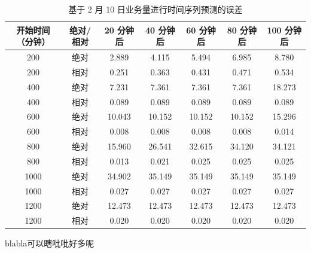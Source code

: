 \documentclass[a4paper]{article}
\begin{document}
\begin{table}[htbp]
	\centering
	\caption{基于 2 月 10 日业务量进行时间序列预测的误差}
	\label{tab:ssa_error}
	\begin{tabular}{cc|ccccc}
		\hline
		开始时间（分钟） & 绝对/相对 & 20 分钟后 & 40 分钟后 & 60 分钟后 & 80 分钟后  & 100 分钟后 \\
		\hline
		200 & 绝对 & 2.889 & 4.115 & 5.494 & 6.985 & 8.780 \\
		200 & 相对 & 0.251 & 0.363 & 0.431 & 0.471 & 0.534 \\
		\hline
		400 & 绝对 & 7.231 & 7.361 & 7.361 & 7.361 & 18.273 \\
		400 & 相对 & 0.089 & 0.089 & 0.089 & 0.089 & 0.089 \\
		\hline
		600 & 绝对 & 10.043 & 10.152 & 10.152 & 10.152 & 15.296 \\
		600 & 相对 & 0.008 & 0.008 & 0.008 & 0.008 & 0.014 \\
		\hline
		800 & 绝对 & 15.960 & 26.541 & 32.615 & 34.120 & 34.121 \\
		800 & 相对 & 0.013 & 0.021 & 0.025 & 0.025 & 0.025 \\
		\hline
		1000 & 绝对 & 34.902 & 35.149 & 35.149 & 35.149 & 35.149 \\
		1000 & 相对 & 0.027 & 0.027 & 0.027 & 0.027 & 0.027 \\
		\hline
		1200 & 绝对 & 12.473 & 12.473 & 12.473 & 12.473 & 12.473 \\
		1200 & 相对 & 0.020 & 0.020 & 0.020 & 0.020 & 0.020 \\
		\hline
	\end{tabular}
\end{table}
blabla可以瞎吡吡好多呢
\end{document}
